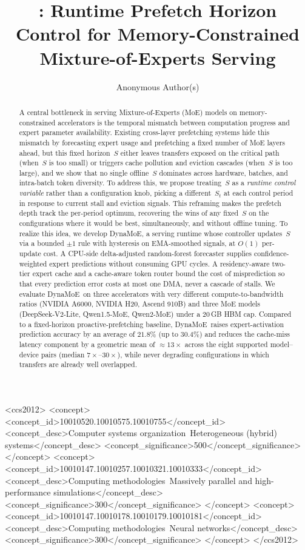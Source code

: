 \documentclass[sigconf,review,anonymous]{acmart}
\title{\systemname: Runtime Prefetch Horizon Control for Memory-Constrained Mixture-of-Experts Serving}
\author{Anonymous Author(s)}
\affiliation{%
  \institution{Submission \#XXX}
  \country{}
}
\newcommand{\systemname}{DynaMoE}
\begin{document}

\begin{abstract}
A central bottleneck in serving Mixture-of-Experts (MoE) models on
memory-constrained accelerators is the temporal mismatch between
computation progress and expert parameter availability.
Existing cross-layer prefetching systems hide this mismatch by
forecasting expert usage and prefetching a fixed number of MoE layers
ahead, but this fixed horizon~$S$ either leaves transfers exposed on
the critical path (when~$S$ is too small) or triggers cache pollution
and eviction cascades (when~$S$ is too large), and we show that no
single offline~$S$ dominates across hardware, batches, and intra-batch
token diversity.
To address this, we propose treating~$S$ as a \emph{runtime control
variable} rather than a configuration knob, picking a different~$S_t$
at each control period in response to current stall and eviction
signals.
This reframing makes the prefetch depth track the per-period optimum,
recovering the wins of any fixed~$S$ on the configurations where it
would be best, simultaneously, and without offline tuning.
To realize this idea, we develop \systemname, a serving runtime whose
controller updates~$S$ via a bounded $\pm 1$ rule with hysteresis on
EMA-smoothed signals, at $O(1)$ per-update cost.
A CPU-side delta-adjusted random-forest forecaster supplies
confidence-weighted expert predictions without consuming GPU cycles.
A residency-aware two-tier expert cache and a cache-aware token router
bound the cost of misprediction so that every prediction error costs
at most one DMA, never a cascade of stalls.
We evaluate \systemname\ on three accelerators with very different
compute-to-bandwidth ratios (NVIDIA A6000, NVIDIA H20, Ascend 910B)
and three MoE models (DeepSeek-V2-Lite, Qwen1.5-MoE, Qwen2-MoE) under
a 20\,GB HBM cap.
Compared to a fixed-horizon proactive-prefetching baseline,
\systemname\ raises expert-activation prediction accuracy by an
average of $21.8\%$ (up to $30.4\%$) and reduces the cache-miss
latency component by a geometric mean of $\approx 13\times$ across
the eight supported model--device pairs (median $7\times$--$30\times$),
while never degrading configurations in which transfers are already
well overlapped.
\end{abstract}

\begin{CCSXML}
<ccs2012>
<concept>
<concept_id>10010520.10010575.10010755</concept_id>
<concept_desc>Computer systems organization~Heterogeneous (hybrid) systems</concept_desc>
<concept_significance>500</concept_significance>
</concept>
<concept>
<concept_id>10010147.10010257.10010321.10010333</concept_id>
<concept_desc>Computing methodologies~Massively parallel and high-performance simulations</concept_desc>
<concept_significance>300</concept_significance>
</concept>
<concept>
<concept_id>10010147.10010178.10010179.10010181</concept_id>
<concept_desc>Computing methodologies~Neural networks</concept_desc>
<concept_significance>300</concept_significance>
</concept>
</ccs2012>
\end{CCSXML}
\end{document}
